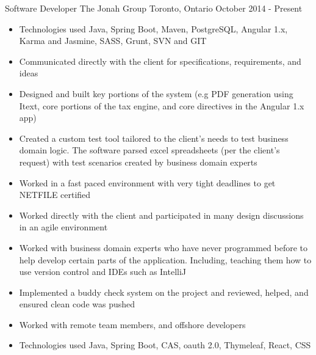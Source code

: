 
\begin{cventries}
    \cventry
    {Software Developer}
    {The Jonah Group}
    {Toronto, Ontario}
    {October 2014 - Present}
    {
        \renewcommand{\labelitemii}{\bullet}
        \begin{cvitems}
            \item[] {
                \begin{itemize}
                    \item {Technologies used Java, Spring Boot, Maven, PostgreSQL, Angular 1.x, Karma and Jasmine, SASS, Grunt, SVN and GIT}
                    \item {Communicated directly with the client for specifications, requirements, and ideas}
                    \item {Designed and built key portions of the system (e.g PDF generation using Itext, core portions of the tax engine, and core directives in the Angular 1.x app)}
                    \item {Created a custom test tool tailored to the client’s needs to test business domain logic. The software parsed excel spreadsheets
                            (per the client’s request) with test scenarios created by business domain experts}
                    \item {Worked in a fast paced environment with very tight deadlines to get NETFILE certified}
                    \item {Worked directly with the client and participated in many design discussions in an agile environment}
                    \item {Worked with business domain experts who have never programmed before to help develop certain parts of the application. Including, teaching them how to use version control and IDEs such as IntelliJ}
                    \item {Implemented a buddy check system on the project and reviewed, helped, and ensured clean code was pushed}
                    \item {Worked with remote team members, and offshore developers}
                \end{itemize}
            }
            \item[] {
                \begin{itemize}
                    \item {Technologies used Java, Spring Boot, CAS, oauth 2.0, Thymeleaf, React, CSS}

\end{itemize}}
\end{cvitems}}
\end{cventries}
